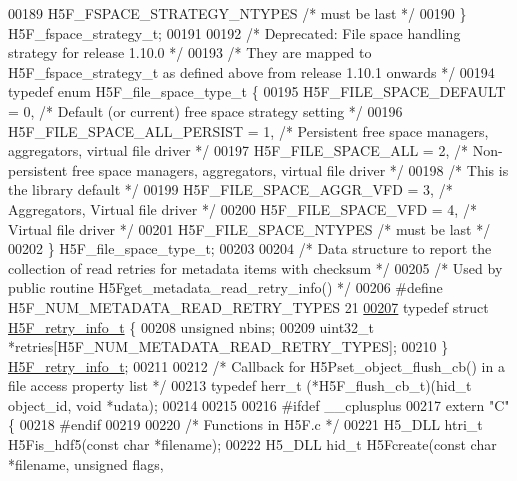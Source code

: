 \begin{DoxyCode}
00189     H5F\_FSPACE\_STRATEGY\_NTYPES      \textcolor{comment}{/* must be last */}
00190 \} H5F\_fspace\_strategy\_t;
00191 
00192 \textcolor{comment}{/* Deprecated: File space handling strategy for release 1.10.0 */}
00193 \textcolor{comment}{/* They are mapped to H5F\_fspace\_strategy\_t as defined above from release 1.10.1 onwards */}
00194 \textcolor{keyword}{typedef} \textcolor{keyword}{enum} H5F\_file\_space\_type\_t \{
00195     H5F\_FILE\_SPACE\_DEFAULT = 0,     \textcolor{comment}{/* Default (or current) free space strategy setting */}
00196     H5F\_FILE\_SPACE\_ALL\_PERSIST = 1, \textcolor{comment}{/* Persistent free space managers, aggregators, virtual file driver */}
00197     H5F\_FILE\_SPACE\_ALL = 2,     \textcolor{comment}{/* Non-persistent free space managers, aggregators, virtual file driver */}
00198                     \textcolor{comment}{/* This is the library default */}
00199     H5F\_FILE\_SPACE\_AGGR\_VFD = 3,    \textcolor{comment}{/* Aggregators, Virtual file driver */}
00200     H5F\_FILE\_SPACE\_VFD = 4,     \textcolor{comment}{/* Virtual file driver */}
00201     H5F\_FILE\_SPACE\_NTYPES       \textcolor{comment}{/* must be last */}
00202 \} H5F\_file\_space\_type\_t;
00203 
00204 \textcolor{comment}{/* Data structure to report the collection of read retries for metadata items with checksum */}
00205 \textcolor{comment}{/* Used by public routine H5Fget\_metadata\_read\_retry\_info() */}
00206 \textcolor{preprocessor}{#define H5F\_NUM\_METADATA\_READ\_RETRY\_TYPES   21}
\hyperlink{struct_h5_f__retry__info__t}{00207} \textcolor{keyword}{typedef} \textcolor{keyword}{struct }\hyperlink{struct_h5_f__retry__info__t}{H5F\_retry\_info\_t} \{
00208     \textcolor{keywordtype}{unsigned} nbins;
00209     uint32\_t *retries[H5F\_NUM\_METADATA\_READ\_RETRY\_TYPES];
00210 \} \hyperlink{struct_h5_f__retry__info__t}{H5F\_retry\_info\_t};
00211 
00212 \textcolor{comment}{/* Callback for H5Pset\_object\_flush\_cb() in a file access property list */}
00213 \textcolor{keyword}{typedef} herr\_t (*H5F\_flush\_cb\_t)(hid\_t object\_id, \textcolor{keywordtype}{void} *udata);
00214 
00215 
00216 \textcolor{preprocessor}{#ifdef \_\_cplusplus}
00217 \textcolor{keyword}{extern} \textcolor{stringliteral}{"C"} \{
00218 \textcolor{preprocessor}{#endif}
00219 
00220 \textcolor{comment}{/* Functions in H5F.c */}
00221 H5\_DLL htri\_t H5Fis\_hdf5(\textcolor{keyword}{const} \textcolor{keywordtype}{char} *filename);
00222 H5\_DLL hid\_t  H5Fcreate(\textcolor{keyword}{const} \textcolor{keywordtype}{char} *filename, \textcolor{keywordtype}{unsigned} flags,

\end{DoxyCode}
